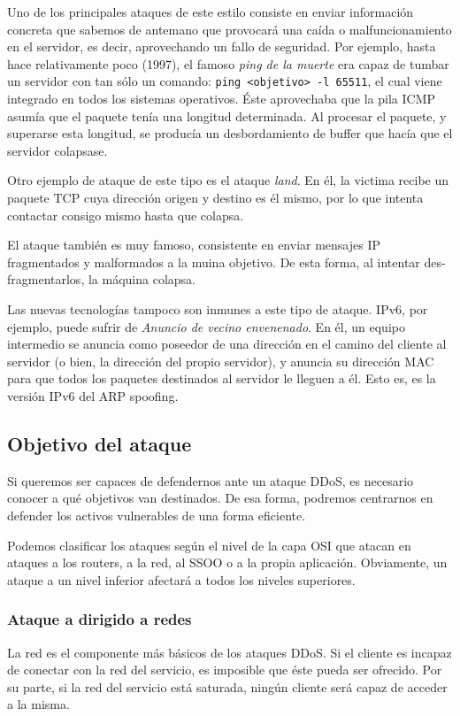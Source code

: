 Uno de los principales ataques de este estilo consiste en enviar información concreta que sabemos de antemano que 
provocará una caída o malfuncionamiento en el servidor, es decir, aprovechando un fallo de seguridad. Por ejemplo, hasta 
hace relativamente poco (1997), el famoso \emph{ping de la muerte} \cite{Bidou} era capaz de 
tumbar un servidor con tan 
sólo un comando: \texttt{ping <objetivo>\ -l 65511}, el cual viene integrado en todos los sistemas operativos. Éste 
aprovechaba que la pila \gls{ICMP} asumía que el paquete tenía una longitud determinada. Al procesar el paquete, y superarse 
esta longitud, se producía un desbordamiento de buffer que hacía que el servidor colapsase.

Otro ejemplo de ataque de este tipo es el ataque \emph{land}. En él, la victima recibe un paquete 
\gls{TCP} cuya dirección origen y destino es él mismo, por lo que intenta contactar consigo mismo hasta que colapsa. 

El ataque \emph{} también es muy famoso, consistente en enviar mensajes IP fragmentados y malformados a 
la muina objetivo. De esta forma, al intentar des-fragmentarlos, la máquina colapsa.

Las nuevas tecnologías tampoco son inmunes a este tipo de ataque. IPv6, por ejemplo, puede sufrir de \emph{Anuncio de 
vecino envenenado}. En él, un equipo intermedio se anuncia como poseedor 
de una dirección en el camino del cliente al servidor (o bien, la dirección del propio servidor), y anuncia su 
dirección MAC para que todos los paquetes destinados al servidor le lleguen a él. Esto es, es la versión IPv6 del ARP 
spoofing.

\subsection{Objetivo del ataque}
Si queremos ser capaces de defendernos ante un ataque DDoS, es necesario conocer a qué objetivos van destinados. De esa 
forma, podremos centrarnos en defender los activos vulnerables de una forma eficiente.

Podemos clasificar los ataques según el nivel de la capa OSI que atacan en ataques a los routers, a la red, al SSOO o a 
la propia aplicación. Obviamente, un ataque a un nivel inferior afectará a todos los niveles superiores.

\subsubsection{Ataque a dirigido a redes}
La red es el componente más básicos de los ataques DDoS. Si el cliente es incapaz de conectar con la red del servicio, 
es imposible que éste pueda ser ofrecido. Por su parte, si la red del servicio está saturada, ningún cliente será capaz 
de acceder a la misma.

